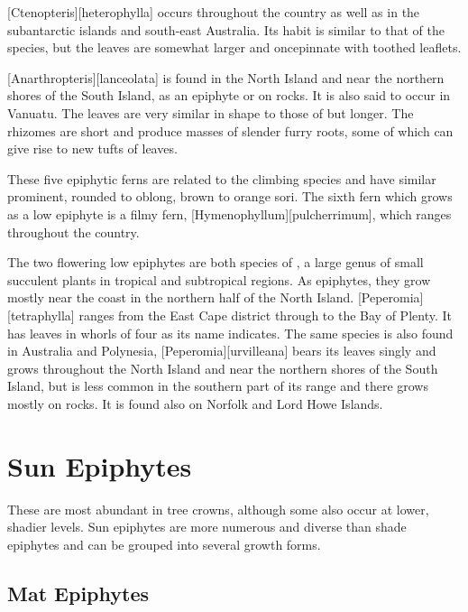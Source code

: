 [Ctenopteris][heterophylla] occurs throughout the country as well as in the subantarctic islands and south-east Australia.
Its habit is similar to that of the  species, but the leaves are somewhat larger and oncepinnate with toothed leaflets.

[Anarthropteris][lanceolata] is found in the North Island and near the northern shores of the South Island, as an epiphyte or on rocks.
It is also said to occur in Vanuatu.
The leaves are very similar in shape to those of  but longer.
The rhizomes are short and produce masses of slender furry roots, some of which can give rise to new tufts of leaves.

These five epiphytic ferns are related to the climbing  species and have similar prominent, rounded to oblong, brown to orange sori.
The sixth fern which grows as a low epiphyte is a filmy fern, [Hymenophyllum][pulcherrimum], which ranges throughout the country.

The two flowering low epiphytes are both species of , a large genus of small succulent plants in tropical and subtropical regions.
As epiphytes, they grow mostly near the coast in the northern half of the North Island. [Peperomia][tetraphylla] ranges from the East Cape district through to the Bay of Plenty.
It has leaves in whorls of four as its name indicates.
The same species is also found in Australia and Polynesia, [Peperomia][urvilleana] bears its leaves singly and grows throughout the North Island and near the northern shores of the South Island, but is less common in the southern part of its range and there grows mostly on rocks.
It is found also on Norfolk and Lord Howe Islands.

\section{Sun Epiphytes}

These are most abundant in tree crowns, although some also occur at lower, shadier levels.
Sun epiphytes are more numerous and diverse than shade epiphytes and can be grouped into several growth forms.

\subsection{Mat Epiphytes}

